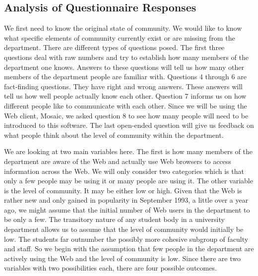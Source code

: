 
\subsection{Analysis of Questionnaire Responses}
We first need to know the original state of community.  We would like to
know what specific elements of community currently exist or are missing
from the department.  There are different types of questions posed.  The
first three questions deal with raw numbers and try to establish how many
members of the department one knows.  Answers to these questions will tell
us how many other members of the department people are familiar with.
Questions 4 through 6 are fact-finding questions.  They have right and
wrong answers.  These answers will tell us how well people actually know
each other.  Question 7 informs us on how different people like to
communicate with each other.  Since we will be using the Web client,
Mosaic, we asked question 8 to see how many people will need to be
introduced to this software.  The last open-ended question will give us
feedback on what people think about the level of community within the
department.

We are looking at two main variables here.  The first is how many members
of the department are aware of the Web and actually use Web browsers to
access information across the Web.  We will only consider two categories
which is that only a few people may be using it or many people are using
it.  The other variable is the level of community.  It may be either low or
high.  Given that the Web is rather new and only gained in popularity in
September  1993, a little over a year ago, we might assume that the initial
number of Web users in the department to be only a few.  The transitory
nature of any student body in a university department allows us to assume
that the level of community would initially be low.  The students far
outnumber the possibly more cohesive subgroup of faculty and staff.  So we
begin with the assumption that few people in the department are actively
using the Web and the level of community is low.  Since there are two
variables with two possibilities each, there are four possible outcomes.

